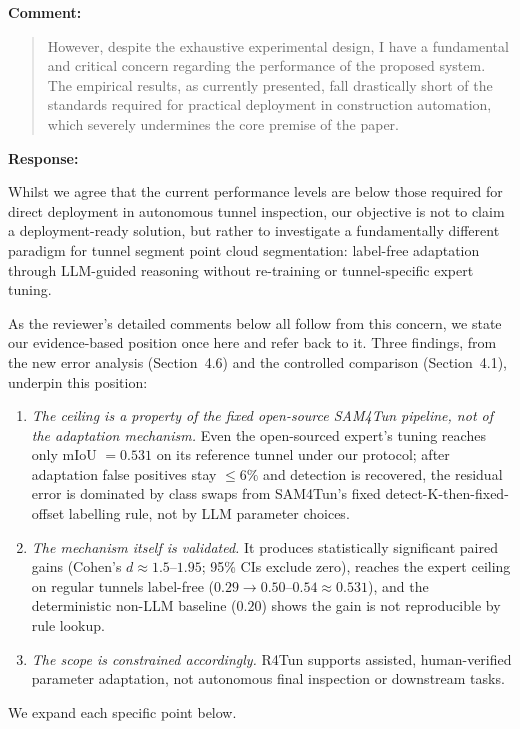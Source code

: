 \documentclass[11pt,a4paper]{article}
\newenvironment{commentblock}{%
  \par\smallskip\noindent\textbf{Comment:}\par
  \begin{quote}\itshape\color{black}
}{%
  \end{quote}\smallskip
}
\newenvironment{responseblock}{%
  \par\smallskip\noindent\textbf{Response:}\par
  \begingroup\color{responsegreen}
}{%
  \endgroup\smallskip
}
\begin{document}
\begin{commentblock}
However, despite the exhaustive experimental design, I have a fundamental and critical concern regarding the performance of the proposed system. The empirical results, as currently presented, fall drastically short of the standards required for practical deployment in construction automation, which severely undermines the core premise of the paper.
\end{commentblock}
\begin{responseblock}
Whilst we agree that the current performance levels are below those required for direct deployment in autonomous tunnel inspection, our objective is not to claim a deployment-ready solution, but rather to investigate a fundamentally different paradigm for tunnel segment point cloud segmentation: label-free adaptation through LLM-guided reasoning without re-training or tunnel-specific expert tuning. 

As the reviewer's detailed comments below all follow from this concern, we state our evidence-based position once here and refer back to it.
Three findings, from the new error analysis (Section~4.6) and the controlled comparison (Section~4.1), underpin this position:
\begin{enumerate}
\item \emph{The ceiling is a property of the fixed open-source SAM4Tun pipeline, not of the adaptation mechanism.} Even the open-sourced expert's tuning reaches only mIoU $= 0.531$ on its reference tunnel under our protocol; after adaptation false positives stay $\leq 6\%$ and detection is recovered, the residual error is dominated by class swaps from SAM4Tun's fixed detect-K-then-fixed-offset labelling rule, not by LLM parameter choices.
\item \emph{The mechanism itself is validated.} It produces statistically significant paired gains (Cohen's $d \approx 1.5$--$1.95$; 95\% CIs exclude zero), reaches the expert ceiling on regular tunnels label-free ($0.29 \rightarrow 0.50$--$0.54 \approx 0.531$), and the deterministic non-LLM baseline ($0.20$) shows the gain is not reproducible by rule lookup.
\item \emph{The scope is constrained accordingly.} R4Tun supports assisted, human-verified parameter adaptation, not autonomous final inspection or downstream tasks.
\end{enumerate}
We expand each specific point below.
\end{responseblock}
\end{document}
